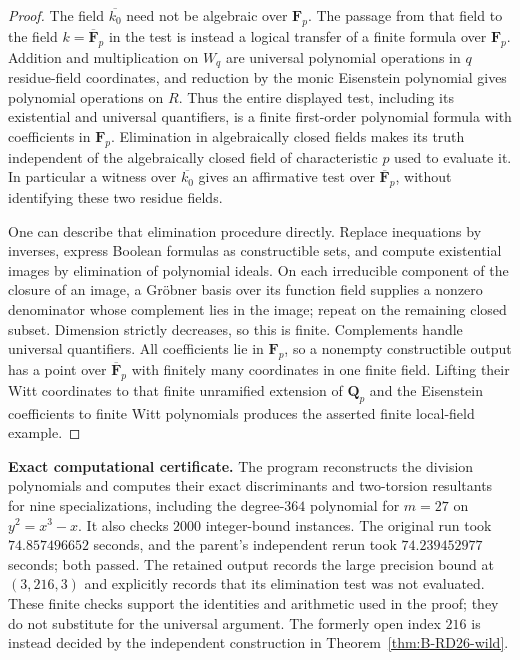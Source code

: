 \begin{proof}
The field $\overline{k_0}$ need not be algebraic over $\mathbf F_p$.  The passage from that field to the field $k=\overline{\mathbf F}_p$ in the test is instead a logical transfer of a finite formula over $\mathbf F_p$.  Addition and multiplication on $W_q$ are universal polynomial operations in $q$ residue-field coordinates, and reduction by the monic Eisenstein polynomial gives polynomial operations on $R$.  Thus the entire displayed test, including its existential and universal quantifiers, is a finite first-order polynomial formula with coefficients in $\mathbf F_p$.  Elimination in algebraically closed fields makes its truth independent of the algebraically closed field of characteristic $p$ used to evaluate it.  In particular a witness over $\overline{k_0}$ gives an affirmative test over $\overline{\mathbf F}_p$, without identifying these two residue fields.

One can describe that elimination procedure directly.  Replace inequations by inverses, express Boolean formulas as constructible sets, and compute existential images by elimination of polynomial ideals.  On each irreducible component of the closure of an image, a Gr\"obner basis over its function field supplies a nonzero denominator whose complement lies in the image; repeat on the remaining closed subset.  Dimension strictly decreases, so this is finite.  Complements handle universal quantifiers.  All coefficients lie in $\mathbf F_p$, so a nonempty constructible output has a point over $\overline{\mathbf F}_p$ with finitely many coordinates in one finite field.  Lifting their Witt coordinates to that finite unramified extension of $\mathbf Q_p$ and the Eisenstein coefficients to finite Witt polynomials produces the asserted finite local-field example.
\end{proof}

\par\smallskip\noindent\textbf{Exact computational certificate.}
The program  reconstructs the division polynomials and computes their exact discriminants and two-torsion resultants for nine specializations, including the degree-$364$ polynomial for $m=27$ on $y^2=x^3-x$.  It also checks $2000$ integer-bound instances.  The original run took $74.857496652$ seconds, and the parent's independent rerun took $74.239452977$ seconds; both passed.  The retained output records the large precision bound at $(3,216,3)$ and explicitly records that its elimination test was not evaluated.  These finite checks support the identities and arithmetic used in the proof; they do not substitute for the universal argument. The formerly open index $216$ is instead decided by the independent construction in Theorem~\ref{thm:B-RD26-wild}.

